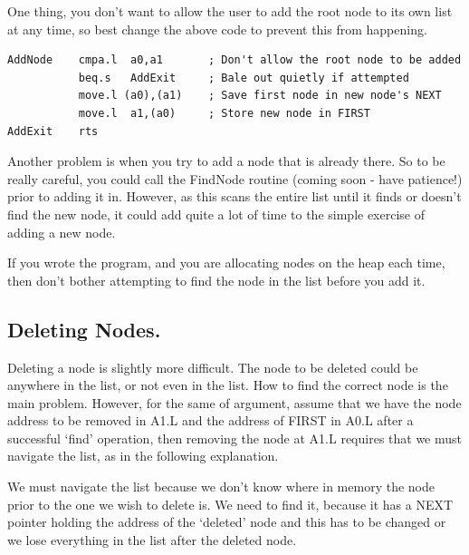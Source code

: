 One thing, you don't want to allow the user to add the root node
      to its own list at any time, so best change the above code to prevent
      this from happening.

\begin{lstlisting}[firstnumber=3,caption={A Better Way of Adding a Node},label={lst:BetterAddingANode}]
AddNode    cmpa.l  a0,a1       ; Don't allow the root node to be added
           beq.s   AddExit     ; Bale out quietly if attempted
           move.l (a0),(a1)    ; Save first node in new node's NEXT
           move.l  a1,(a0)     ; Store new node in FIRST
AddExit    rts
\end{lstlisting}

Another problem is when you try to add a node that is already
      there. So to be really careful, you could call the FindNode routine
      (coming soon -{} have patience!) prior to adding it in. However, as this
      scans the entire list until it finds or doesn't find the new node, it
      could add quite a lot of time to the simple exercise of adding a new
      node.

If you wrote the program, and you are allocating nodes on the heap
      each time, then don't bother attempting to find the node in the list
      before you add it.

\subsection{Deleting Nodes.}
\label{ch10-deleting-nodes}%

Deleting a node is slightly more difficult. The node to be deleted
      could be anywhere in the list, or not even in the list. How to find the
      correct node is the main problem. However, for the same of argument,
      assume that we have the node address to be removed in A1.L and the
      address of FIRST in A0.L after a successful `find' operation, then
      removing the node at A1.L requires that we must navigate the list, as in
      the following explanation.

We must navigate the list because we don't know where in memory
      the node prior to the one we wish to delete is. We need to find it,
      because it has a NEXT pointer holding the address of the `deleted' node
      and this has to be changed or we lose everything in the list after the
      deleted node.


